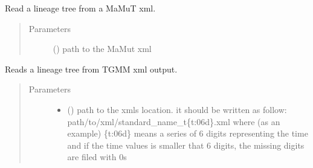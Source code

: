 \documentclass[letterpaper,10pt,english]{sphinxmanual}
\begin{document}
\begin{fulllineitems}

\begin{fulllineitems}
\label{\detokenize{index:LineageTree.lineageTree.read_from_mamut_xml}}
Read a lineage tree from a MaMuT xml.
\begin{quote}\begin{description}
\item[{Parameters}] \leavevmode
{} () \textendash{} path to the MaMut xml

\end{description}\end{quote}

\end{fulllineitems}


\begin{fulllineitems}
\label{\detokenize{index:LineageTree.lineageTree.read_from_txt_for_celegans}}
\end{fulllineitems}


\begin{fulllineitems}
\label{\detokenize{index:LineageTree.lineageTree.read_tgmm_xml}}
Reads a lineage tree from TGMM xml output.
\begin{quote}\begin{description}
\item[{Parameters}] \leavevmode\begin{itemize}
\item {} 
 () \textendash{} path to the xmls location.
it should be written as follow:
path/to/xml/standard\_name\_t\{t:06d\}.xml where (as an example)
\{t:06d\} means a series of 6 digits representing the time and
if the time values is smaller that 6 digits, the missing
digits are filed with 0s


\end{itemize}
\end{description}
\end{quote}
\end{fulllineitems}
\end{fulllineitems}
\end{document}
